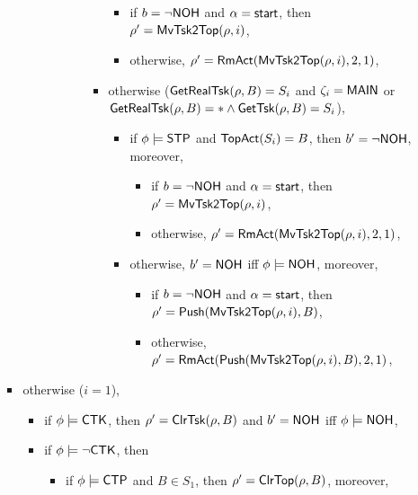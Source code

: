 \begin{itemize}
\begin{itemize}
\begin{itemize}
\begin{itemize}
\begin{itemize}
\begin{itemize}
\begin{itemize}
\begin{itemize}
									\item if $b = \neg {\sf NOH}$ and $\alpha = {\mathsf{start} }$, then $\rho'=\mathsf{MvTsk2Top}(\rho, i)$,
									\item otherwise, $\rho' = \mathsf{RmAct}(\mathsf{MvTsk2Top}(\rho, i), 2, 1)$, 
								\end{itemize}
								\item otherwise ($\mathsf{GetRealTsk}(\rho,B) = S_i$ and $\zeta_i = {\sf MAIN}$ or $\mathsf{GetRealTsk}(\rho,B) = * \wedge\mathsf{GetTsk}(\rho,B) = S_i$), 
								\begin{itemize}
									\item if $\phi\models{\sf STP}$ and $\mathsf{TopAct}(S_i) = B$, then $b' = \neg {\sf NOH}$, moreover,
									\begin{itemize}
										\item if $b = \neg {\sf NOH}$ and $\alpha = {\mathsf{start} }$, then $\rho'=\mathsf{MvTsk2Top}(\rho, i)$,
										\item otherwise, $\rho' = \mathsf{RmAct}(\mathsf{MvTsk2Top}(\rho, i), 2, 1)$, 
									\end{itemize}
									\item otherwise, $b' = {\sf NOH}$ iff $\phi \models {\sf NOH}$, moreover, 
									\begin{itemize}
										\item if $b = \neg {\sf NOH}$ and $\alpha = {\mathsf{start} }$, then $\rho'=\mathsf{Push}(\mathsf{MvTsk2Top}(\rho, i), B)$,
										\item otherwise, $\rho' = \mathsf{RmAct}(\mathsf{Push}(\mathsf{MvTsk2Top}(\rho, i), B), 2, 1)$, 
									\end{itemize}
								\end{itemize}
							\end{itemize}
						\end{itemize}
					\end{itemize}
			\end{itemize}
		\item otherwise ($i  = 1$),  
		\begin{itemize}
			\item if $\phi \models {\sf CTK}$, then $\rho' = \mathsf{ClrTsk}(\rho,B)$ and $b' = {\sf NOH}$ iff $\phi \models {\sf NOH}$, 
			\item if $\phi \models \neg {\sf CTK}$, then
			\begin{itemize}
				\item if $\phi \models {\sf CTP}$ and $B \in S_1$, then $\rho'=\mathsf{ClrTop}(\rho, B)$, moreover, 

\end{itemize}
\end{itemize}
\end{itemize}
\end{itemize}
\end{itemize}
